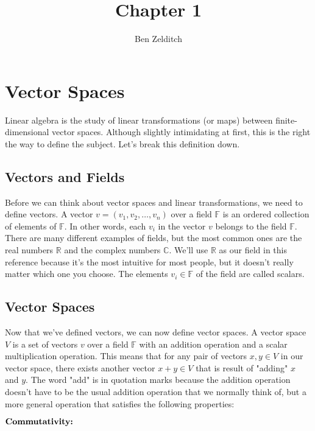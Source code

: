 \documentclass[12pt]{article}
\title{Chapter 1}
\author{Ben Zelditch}
\begin{document}
\maketitle

\section*{Vector Spaces}

Linear algebra is the study of linear transformations (or maps) between finite-dimensional vector spaces. Although slightly intimidating at first, this is the
right the way to define the subject. Let's break this definition down.

\subsection*{Vectors and Fields}

Before we can think about vector spaces and linear transformations, we need to define vectors. A vector $v = (v_1, v_2, \ldots, v_n)$ over a field $\mathbb{F}$ is an ordered collection of elements of $\mathbb{F}$. In other words, each $v_i$ in the vector $v$ belongs to the field $\mathbb{F}$. There are many different examples of fields, but the most common ones are the real numbers $\mathbb{R}$ and the complex numbers $\mathbb{C}$. We'll use $\mathbb{R}$ as our field in this reference because it's the most intuitive for most people, but it doesn't really matter which one you choose. The elements $v_i \in \mathbb{F}$ of the field are called scalars.

\subsection*{Vector Spaces}

Now that we've defined vectors, we can now define vector spaces. A vector space $V$ is a set of vectors $v$ over a field $\mathbb{F}$ with an addition operation and a scalar multiplication operation. This means that for any pair of vectors $x, y \in V$ in our vector space, there exists another vector $x + y \in V$ that is result of "adding" $x$ and $y$. The word "add" is in quotation marks because the addition operation doesn't have to be the usual addition operation that we normally think of, but a more general operation that satisfies the following properties:

\vskip 1mm

$\textbf{\textrm{Commutativity:}}$
\end{document}
